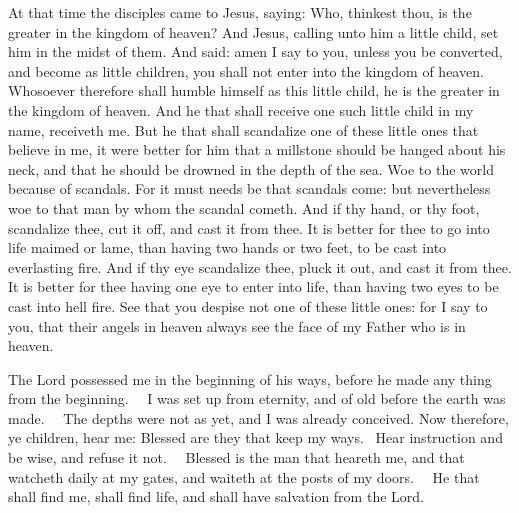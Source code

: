 
At that time the disciples came to Jesus, saying: Who, thinkest
thou, is the greater in the kingdom of heaven?
And Jesus, calling unto him a little child, set him in the midst
of them.
And said: amen I say to you, unless you be converted, and become
as little children, you shall not enter into the kingdom of heaven.
Whosoever therefore shall humble himself as this little child, he
is the greater in the kingdom of heaven.
And he that shall receive one such little child in my name,
receiveth me.
But he that shall scandalize one of these little ones that believe
in me, it were better for him that a millstone should be hanged about
his neck, and that he should be drowned in the depth of the sea.
Woe to the world because of scandals. For it must needs be that
scandals come: but nevertheless woe to that man by whom the scandal
cometh.
And if thy hand, or thy foot, scandalize thee, cut it off, and
cast it from thee. It is better for thee to go into life maimed or lame,
than having two hands or two feet, to be cast into everlasting fire.
And if thy eye scandalize thee, pluck it out, and cast it from
thee. It is better for thee having one eye to enter into life, than
having two eyes to be cast into hell fire.
See that you despise not one of these little ones: for I say to
you, that their angels in heaven always see the face of my Father who is
in heaven.

\bigskip




The Lord possessed me in the beginning of his ways, before he made any thing
from the beginning.   I was set up from eternity, and of old before the earth
was made.   The depths were not as yet, and I was already conceived. Now therefore, ye children, hear
me: Blessed are they that keep my ways.  Hear instruction and be wise, and
refuse it not.   Blessed is the man that heareth me, and that watcheth daily at
my gates, and waiteth at the posts of my doors.   He that shall find me, shall
find life, and shall have salvation from the Lord.



